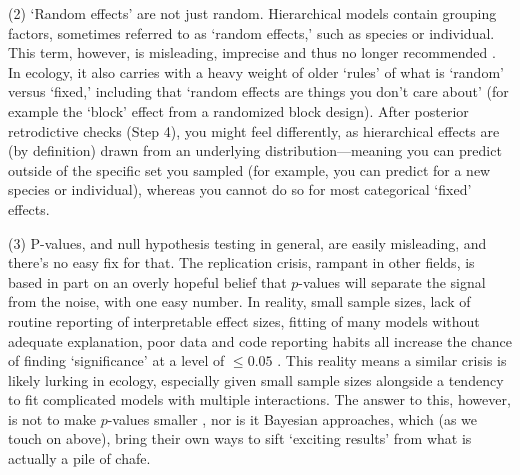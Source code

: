 \documentclass[11pt]{article}
\begin{document}
{(2) `Random effects' are not just random. Hierarchical models contain grouping factors, sometimes referred to as `random effects,' such as species or individual. This term, however, is misleading, imprecise and thus no longer recommended \citep{gelmanhill}. In ecology, it also carries with a heavy weight of older `rules' of what is `random' versus `fixed,' including that `random effects are things you don't care about' (for example the `block' effect from a randomized block design). After posterior retrodictive checks (Step 4), you might feel differently, as hierarchical effects are (by definition) drawn from an underlying distribution---meaning you can predict outside of the specific set you sampled (for example, you can predict for a new species or individual), whereas you cannot do so for most categorical `fixed' effects.

(3) P-values, and null hypothesis testing in general, are easily misleading, and there’s no easy fix for that. The replication crisis, rampant in other fields, is based in part on an overly hopeful belief that $p$-values will separate the signal from the noise, with one easy number. In reality, small sample sizes, lack of routine reporting of interpretable effect sizes, fitting of many models without adequate explanation, poor data and code reporting habits all increase the chance of finding `significance' at a level of $\le0.05$ \citep{halsey2015,loken2017}. This reality means a similar crisis is likely lurking in ecology, especially given small sample sizes alongside a tendency to fit complicated models with multiple interactions. The answer to this, however, is not to make $p$-values smaller \citep{halsey2015,colquhoun2017}, nor is it Bayesian approaches, which (as we touch on above), bring their own ways to sift `exciting results' from what is actually a pile of chafe. %

}
\end{document}
